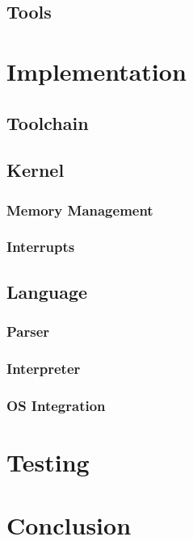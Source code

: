 \documentclass{report}
\begin{document}
\section{Tools}


\chapter{Implementation}

\section{Toolchain}

\section{Kernel}
\subsection{Memory Management}
\subsection{Interrupts}


\section{Language}
\subsection{Parser}
\subsection{Interpreter}
\subsection{OS Integration}


\chapter{Testing}


\chapter{Conclusion}




\end{document}
